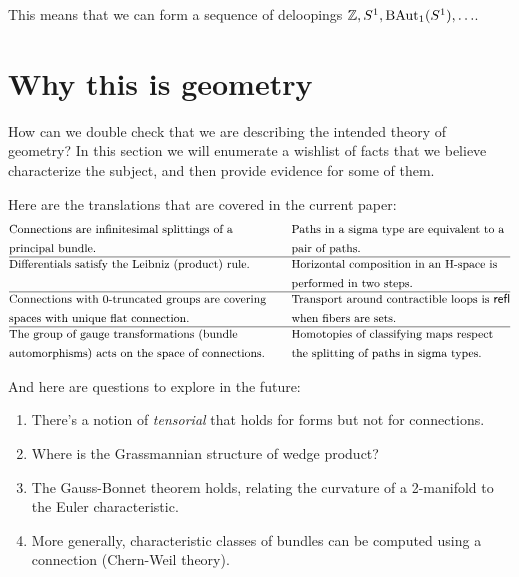 \documentclass[12pt]{article}
\begin{document}
This means that we can form a sequence of deloopings \( \mathbb{Z}, S^1, \mathrm{BAut}_1(S^1), \ldots \).



 
\section{Why this is geometry}

How can we double check that we are describing the intended theory of geometry? In this section we will enumerate a wishlist of facts that we believe characterize the subject, and then provide evidence for some of them.

Here are the translations that are covered in the current paper:
\begin{align*}
& \text{\small Connections are infinitesimal splittings of a} & \quad &\text{\small Paths in a sigma type are equivalent to a}        \\
& \text{\small principal bundle.} & \quad&\text{\small pair of paths.}        \\ \hline
& \text{\small Differentials satisfy the Leibniz (product) rule.} &\quad  &\text{\small Horizontal composition in an H-space is} \\ 
&  &  \quad&\text{\small performed in two steps.} \\ \hline
& \text{\small Connections with 0-truncated groups are covering}        &\quad &\text{\small Transport around contractible loops is } \mathsf{refl}             \\ 
& \text{\small spaces with unique flat connection.}        & \quad&\text{\small when fibers are sets.}             \\ \hline
& \text{\small The group of gauge transformations (bundle} &\quad &\text{\small Homotopies of classifying maps respect } \\ 
& \text{\small automorphisms) acts on the space of connections.} & \quad&\text{\small the splitting of paths in sigma types.} \\ 
\end{align*}

And here are questions to explore in the future:
\begin{enumerate}
\item There's a notion of \emph{tensorial} that holds for forms but not for connections.
\item Where is the Grassmannian structure of wedge product?
\item The Gauss-Bonnet theorem holds, relating the curvature of a 2-manifold to the Euler characteristic.
\item More generally, characteristic classes of bundles can be computed using a connection (Chern-Weil theory).
\end{enumerate}
\end{document}
